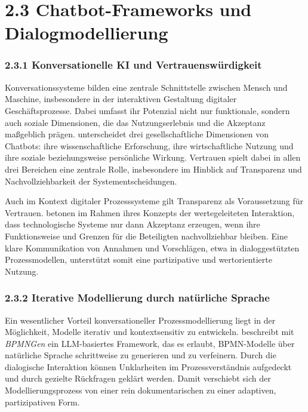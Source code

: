 \documentclass[a4paper,12pt]{scrreprt}
\begin{document}
\section*{2.3 Chatbot-Frameworks und Dialogmodellierung}

\subsubsection*{2.3.1 Konversationelle KI und Vertrauenswürdigkeit}

Konversationssysteme bilden eine zentrale Schnittstelle zwischen Mensch und Maschine, insbesondere in der interaktiven Gestaltung digitaler Geschäftsprozesse. 
Dabei umfasst ihr Potenzial nicht nur funktionale, sondern auch soziale Dimensionen, die das Nutzungserlebnis und die Akzeptanz maßgeblich prägen. 
\citet[S.~3--5]{FigueroaTorres2024} unterscheidet drei gesellschaftliche Dimensionen von Chatbots: 
ihre wissenschaftliche Erforschung, ihre wirtschaftliche Nutzung und ihre soziale beziehungsweise persönliche Wirkung. 
Vertrauen spielt dabei in allen drei Bereichen eine zentrale Rolle, insbesondere im Hinblick auf Transparenz und Nachvollziehbarkeit der Systementscheidungen. 

Auch im Kontext digitaler Prozesssysteme gilt Transparenz als Voraussetzung für Vertrauen. 
\citet[S.~220--225]{ElstermannEtAl2023} betonen im Rahmen ihres Konzepts der wertegeleiteten Interaktion, 
dass technologische Systeme nur dann Akzeptanz erzeugen, wenn ihre Funktionsweise und Grenzen für die Beteiligten nachvollziehbar bleiben. 
Eine klare Kommunikation von Annahmen und Vorschlägen, etwa in dialoggestützten Prozessmodellen, 
unterstützt somit eine partizipative und wertorientierte Nutzung.

\subsubsection*{2.3.2 Iterative Modellierung durch natürliche Sprache}

Ein wesentlicher Vorteil konversationeller Prozessmodellierung liegt in der Möglichkeit, Modelle iterativ und kontextsensitiv zu entwickeln. 
\citet[S.~27--31]{Hoerner2025} beschreibt mit \textit{BPMNGen} ein LLM-basiertes Framework, das es erlaubt, 
BPMN-Modelle über natürliche Sprache schrittweise zu generieren und zu verfeinern. 
Durch die dialogische Interaktion können Unklarheiten im Prozessverständnis aufgedeckt und durch gezielte Rückfragen geklärt werden. 
Damit verschiebt sich der Modellierungsprozess von einer rein dokumentarischen zu einer adaptiven, partizipativen Form. 
\end{document}
